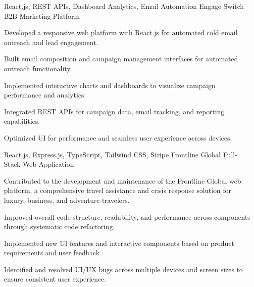 \newpage
{}


\begin{cventries}

  \cventry
    {React.js, REST APIs, Dashboard Analytics, Email Automation} %
    {Engage Switch} %
    {B2B Marketing Platform} %
    {}
    {
      \begin{cvitems} %
        \item {Developed a responsive web platform with React.js for automated cold email outreach and lead engagement.}
        \item {Built email composition and campaign management interfaces for automated outreach functionality.}
        \item {Implemented interactive charts and dashboards to visualize campaign performance and analytics.}
        \item {Integrated REST APIs for campaign data, email tracking, and reporting capabilities.}
        \item {Optimized UI for performance and seamless user experience across devices.}
      \end{cvitems}
    }

  \cventry
    {React.js, Express.js, TypeScript, Tailwind CSS, Stripe} %
    {Frontline Global} %
    {Full-Stack Web Application}
    {}
    {
      \begin{cvitems} %
        \item {Contributed to the development and maintenance of the Frontline Global web platform, a comprehensive travel assistance and crisis response solution for luxury, business, and adventure travelers.}
        \item {Improved overall code structure, readability, and performance across components through systematic code refactoring.}
        \item {Implemented new UI features and interactive components based on product requirements and user feedback.}
        \item {Identified and resolved UI/UX bugs across multiple devices and screen sizes to ensure consistent user experience.}
      \end{cvitems}
    }


\end{cventries}

